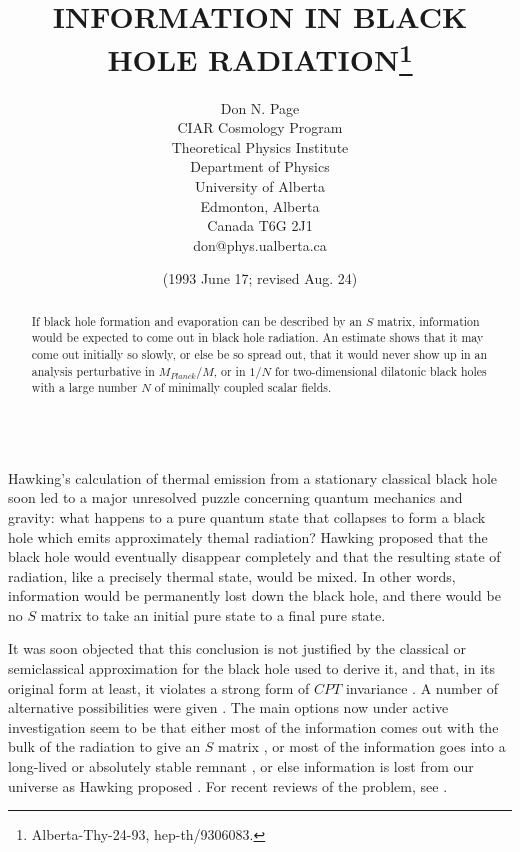 \title{INFORMATION IN BLACK HOLE  RADIATION\thanks
{Alberta-Thy-24-93, hep-th/9306083.}}
\author{ Don N. Page\\
CIAR Cosmology Program\\
Theoretical Physics Institute\\
Department of Physics\\University of Alberta\\
Edmonton, Alberta\\Canada T6G 2J1\\
don@phys.ualberta.ca}
\date{(1993 June 17; revised Aug. 24)}
\maketitle
\large
\begin{abstract}
\baselineskip 16pt
     If black hole formation and evaporation can be described by an
$S$ matrix, information would be expected to come out in black hole
radiation.  An estimate shows that it
may come out initially so slowly, or else be so spread out,
that it would never show up in an analysis
perturbative in $M_{Planck}/M$, or in $1/N$ for
two-dimensional dilatonic black holes with a large number
$N$ of minimally coupled scalar fields.
\\
\\
\end{abstract}
\normalsize
\pagebreak
\baselineskip 15pt

	Hawking's calculation of thermal emission from a
stationary classical black hole \cite{Haw74,Haw76}
soon led to a major unresolved puzzle concerning quantum mechanics
and gravity:  what happens to a pure quantum state that collapses
to form a black hole which emits approximately themal radiation?
Hawking proposed \cite{Haw76} that the black hole would eventually
disappear completely and that the resulting state of radiation,
like a precisely thermal state, would be mixed.  In other words,
information would be permanently lost down the black hole,
and there would be no $S$ matrix to take an initial pure state
to a final pure state.

	    It was soon objected \cite{Zel77b,Pag80} that this
conclusion
is not justified by the classical or semiclassical approximation for
the
black hole used to derive it, and that, in its original form at
least, it
violates a strong form of $CPT$ invariance \cite{Pag80}.  A number of
alternative possibilities were given \cite{Pag80}.  The main options
now under active investigation seem to be that either most of the
information comes out with the bulk of the radiation to give an $S$
matrix
\cite{Pag80,Hoo,uni2DBH,STU}, or most of the information goes
into a long-lived \cite{ACN,Pre92} or absolutely stable remnant
\cite{BDDO'L}, or else information
is lost from our universe as Hawking proposed \cite{Haw76}.
For recent reviews of the problem, see
\cite{Pre92,HS,Gid92,Pag93,DanSch,Gid93}.

